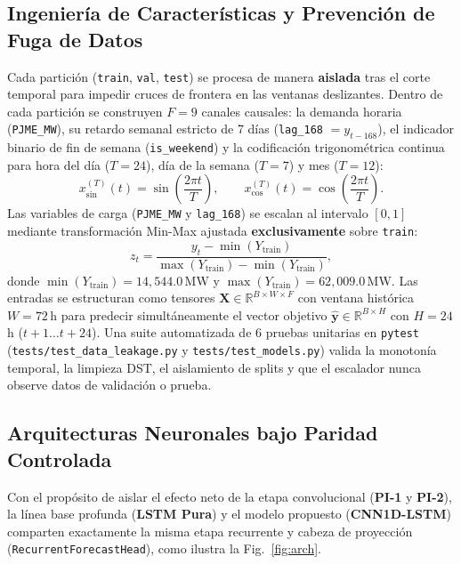 \documentclass[conference]{IEEEtran}
\begin{document}
\subsection{Ingeniería de Características y Prevención de Fuga de Datos}
Cada partición (\texttt{train}, \texttt{val}, \texttt{test}) se procesa de manera \textbf{aislada} tras el corte temporal para impedir cruces de frontera en las ventanas deslizantes. Dentro de cada partición se construyen $F=9$ canales causales: la demanda horaria (\texttt{PJME\_MW}), su retardo semanal estricto de 7 días (\texttt{lag\_168} $= y_{t-168}$), el indicador binario de fin de semana (\texttt{is\_weekend}) y la codificación trigonométrica continua para hora del día ($T=24$), día de la semana ($T=7$) y mes ($T=12$):
\begin{equation}
    x_{\sin}^{(T)}(t) = \sin\!\left(\frac{2\pi t}{T}\right), \qquad x_{\cos}^{(T)}(t) = \cos\!\left(\frac{2\pi t}{T}\right).
\end{equation}
Las variables de carga (\texttt{PJME\_MW} y \texttt{lag\_168}) se escalan al intervalo $[0,1]$ mediante transformación Min-Max ajustada \textbf{exclusivamente} sobre \texttt{train}:
\begin{equation}
    z_t = \frac{y_t - \min(Y_{\text{train}})}{\max(Y_{\text{train}}) - \min(Y_{\text{train}})},
\end{equation}
donde $\min(Y_{\text{train}})=14{,}544.0$\,MW y $\max(Y_{\text{train}})=62{,}009.0$\,MW. Las entradas se estructuran como tensores $\mathbf{X} \in \mathbb{R}^{B \times W \times F}$ con ventana histórica $W=72$\,h para predecir simultáneamente el vector objetivo $\hat{\mathbf{y}} \in \mathbb{R}^{B \times H}$ con $H=24$\,h ($t+1 \dots t+24$). Una suite automatizada de 6 pruebas unitarias en \texttt{pytest} (\texttt{tests/test\_data\_leakage.py} y \texttt{tests/test\_models.py}) valida la monotonía temporal, la limpieza DST, el aislamiento de splits y que el escalador nunca observe datos de validación o prueba.

\subsection{Arquitecturas Neuronales bajo Paridad Controlada}
Con el propósito de aislar el efecto neto de la etapa convolucional (\textbf{PI-1} y \textbf{PI-2}), la línea base profunda (\textbf{LSTM Pura}) y el modelo propuesto (\textbf{CNN1D-LSTM}) comparten exactamente la misma etapa recurrente y cabeza de proyección (\texttt{RecurrentForecastHead}), como ilustra la Fig.~\ref{fig:arch}.
\end{document}
